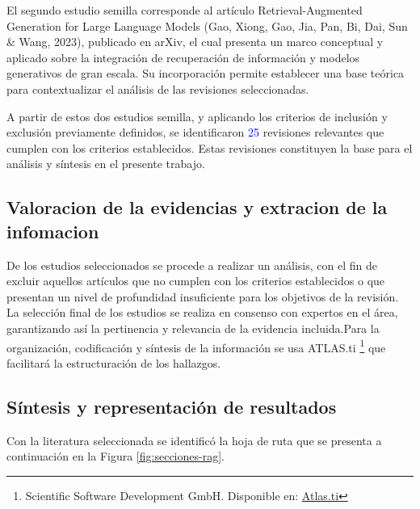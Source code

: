El segundo estudio semilla corresponde al artículo Retrieval-Augmented Generation for Large Language Models (Gao, Xiong, Gao, Jia, Pan, Bi, Dai, Sun \& Wang, 2023), publicado en
arXiv,
el cual presenta un marco conceptual y aplicado sobre la integración de recuperación de información y modelos generativos de gran escala. Su incorporación permite 
establecer una base teórica para contextualizar el análisis de las revisiones seleccionadas.

A partir de estos dos estudios semilla, y aplicando los criterios de inclusión y exclusión previamente definidos, se identificaron \textcolor{blue}{25} revisiones 
relevantes que cumplen con los criterios establecidos. 
Estas revisiones constituyen la base para el análisis y síntesis en el presente trabajo.



\subsection{Valoracion de la evidencias y extracion de la infomacion}
De los estudios seleccionados se procede a realizar un análisis, 
con el fin de excluir aquellos artículos que no cumplen con los criterios establecidos 
o que presentan un nivel de profundidad insuficiente para los objetivos de la revisión. 
La selección final de los estudios se realiza en consenso con expertos en el área, 
garantizando así la pertinencia y relevancia de la evidencia incluida.Para la organización, codificación y síntesis de la 
información se usa ATLAS.ti \footnote{Scientific Software Development GmbH. Disponible en: \href{https://atlasti.com/es}{Atlas.ti}} que facilitará la estructuración de los hallazgos.






\subsection{Síntesis y representación de resultados}
Con la literatura seleccionada se identificó la hoja de ruta que se presenta a continuación en la Figura \ref{fig:secciones-rag}.


